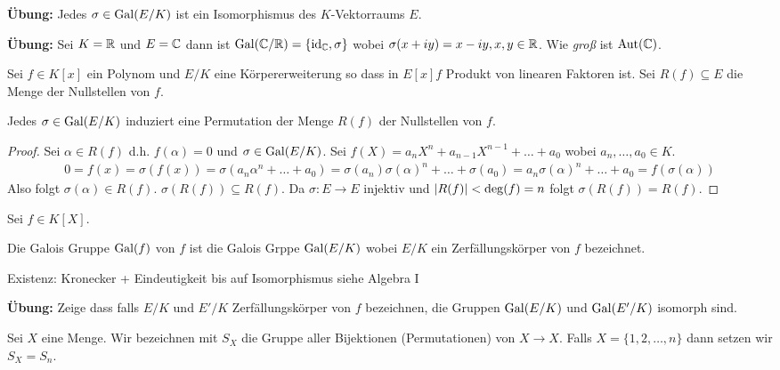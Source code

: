\textbf{Übung:} Jedes $\sigma \in \operatorname{Gal}(E / K)$ ist ein Isomorphismus des $K$-Vektorraums $E$.

\textbf{Übung:} Sei $K = \mathbb{R}$ und $E = \mathbb{C}$ dann ist $\operatorname{Gal}(\mathbb{C} / \mathbb{R}) = \{\operatorname{id}_{\mathbb{C}}, \sigma\} $ wobei $\sigma(x+iy) = x-iy, x,y \in \mathbb{R}$.
Wie \emph{groß} ist $\operatorname{Aut}(\mathbb{C})$.

Sei $f \in K[x]$ ein Polynom und $E / K $ eine Körpererweiterung so dass in $E[x] f$ Produkt von linearen Faktoren ist.
Sei $R(f) \subseteq E$ die Menge der Nullstellen von $f$.

\begin{lemma}
	Jedes $\sigma \in \operatorname{Gal}(E / K)$ induziert eine Permutation der Menge $R(f)$ der Nullstellen von $f$.
\end{lemma}

\begin{proof}
	Sei $\alpha \in R(f)$ d.h. $f(\alpha) = 0$ und $\sigma \in \operatorname{Gal}(E / K)$.
	Sei $f(X) = a_{n} X^{n} + a_{n-1} X^{n-1} + \ldots + a_0$ wobei $a_{n},\ldots,a_0 \in K$.
	\begin{align*}
		0 = f(x) = \sigma(f(x)) = \sigma(a_{n} \alpha^{n} + \ldots + a_0) = \sigma(a_{n}) \sigma(\alpha)^{n} + \ldots + \sigma(a_0) 
		= a_{n} \sigma(\alpha)^{n} + \ldots + a_0 = f(\sigma(\alpha))
	\end{align*}
	Also folgt $\sigma(\alpha) \in R(f)$.
	$\sigma(R(f)) \subseteq R(f)$. Da $\sigma: E \to E$ injektiv und $\abs{R(f)} < \deg(f) = n$ folgt $\sigma(R(f)) = R(f)$.
\end{proof}

Sei $f \in K[X]$.
\begin{definition}
	Die Galois Gruppe $\operatorname{Gal}(f)$ von $f$ ist die Galois Grppe $\operatorname{Gal}(E / K)$ wobei $E / K$ ein Zerfällungskörper
	von $f$ bezeichnet.
\end{definition}
Existenz: Kronecker + Eindeutigkeit bis auf Isomorphismus siehe Algebra I

\textbf{Übung:} Zeige dass falls $E / K$ und $E' / K$ Zerfällungskörper von $f$ bezeichnen, die Gruppen
$\operatorname{Gal}(E / K)$ und $\operatorname{Gal}(E'/K)$ isomorph sind.

\begin{notation}
	Sei $X$ eine Menge. Wir bezeichnen mit $S_{X}$ die Gruppe aller Bijektionen (Permutationen) von $X \to X$.
	Falls $X = \{1,2,\ldots,n\}$ dann setzen wir $S_{X} = S_{n}$.
\end{notation}

